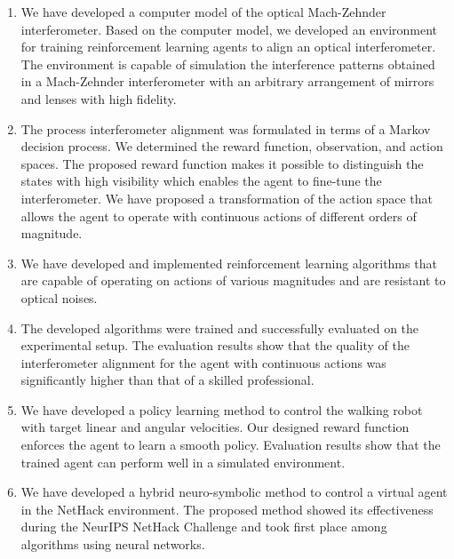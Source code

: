 \begin{enumerate}
  \item We have developed a computer model of the optical Mach-Zehnder interferometer. Based on the computer model, we developed an environment for training reinforcement learning agents to align an optical interferometer. The environment is capable of simulation the interference patterns obtained in a Mach-Zehnder interferometer with an arbitrary arrangement of mirrors and lenses with high fidelity.
  \item The process interferometer alignment was formulated in terms of a Markov decision process. We determined the reward function, observation, and action spaces. The proposed reward function makes it possible to distinguish the states with high visibility which enables the agent to fine-tune the interferometer. We have proposed a transformation of the action space that allows the agent to operate with continuous actions of different orders of magnitude.    
  \item We have developed and implemented reinforcement learning algorithms that are capable of operating on actions of various magnitudes and are resistant to optical noises.
  \item The developed algorithms were trained and successfully evaluated on the experimental setup. The evaluation results show that the quality of the interferometer alignment for the agent with continuous actions was significantly higher than that of a skilled professional.
  \item We have developed a policy learning method to control the walking robot with target linear and angular velocities. Our designed reward function enforces the agent to learn a smooth policy. Evaluation results show that the trained agent can perform well in a simulated environment.
  \item We have developed a hybrid neuro-symbolic method to control a virtual agent in the NetHack environment. The proposed method showed its effectiveness during the NeurIPS NetHack Challenge and took first place among algorithms using neural networks.
\end{enumerate}

\newpage



